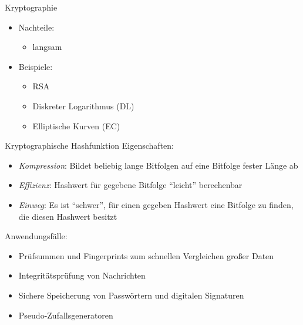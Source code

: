\begin{bonus}{Kryptographie}
\begin{itemize}
\begin{itemize}
\begin{itemize}
                            \item Zum Authentifizieren verschlüsselt man eine öffentliche Nachricht\footnote{z. B. seine MAC-Adresse} mit seinem privaten Schlüssel.
                                  Wenn der erwartete Inhalt beim Entschlüsseln mit dem öffentlichen Schlüssel des Geräts erhalten wird, ist der Client authentifiziert\footnote{Wenn Dritte Zugriff zu dem privaten Schlüssel erhalten, können sie sich als das betroffene Gerät ausgeben}.
                        \end{itemize}
                  \item Nachteile:
                        \begin{itemize}
                            \item langsam
                        \end{itemize}
                  \item Beispiele:
                        \begin{itemize}
                            \item RSA
                            \item Diskreter Logarithmus (DL)
                            \item Elliptische Kurven (EC)
                        \end{itemize}
              \end{itemize}
    \end{itemize}
\end{bonus}

\begin{bonus}{Kryptographische Hashfunktion}
    Eigenschaften:
    \begin{itemize}
        \item \emph{Kompression}: Bildet beliebig lange Bitfolgen auf eine Bitfolge fester Länge ab
        \item \emph{Effizienz}: Hashwert für gegebene Bitfolge \enquote{leicht} berechenbar
        \item \emph{Einweg}: Es ist \enquote{schwer}, für einen gegeben Hashwert eine Bitfolge zu finden, die diesen Hashwert besitzt
    \end{itemize}

    Anwendungsfälle:
    \begin{itemize}
        \item Prüfsummen und Fingerprints zum schnellen Vergleichen großer Daten
        \item Integritätsprüfung von Nachrichten
        \item Sichere Speicherung von Passwörtern und digitalen Signaturen
        \item Pseudo-Zufallsgeneratoren
    \end{itemize}
\end{bonus}

